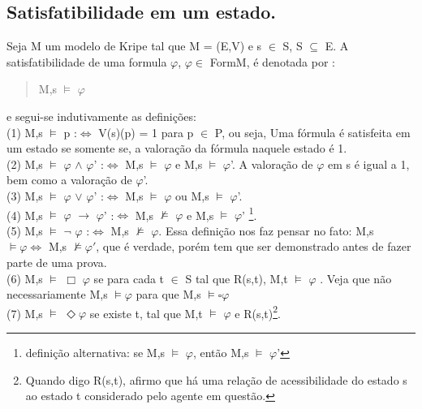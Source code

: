 \documentclass[12pt]{report}
\begin{document}
 \subsection{Satisfatibilidade em um estado.}%
 \hspace{0.5cm} Seja M um modelo de Kripe tal que M = (E,V) e s $\in$ S, S $\subseteq$ E. A satisfatibilidade de uma formula $\varphi$, $\varphi \in$ FormM, é denotada por :
 \begin{quote}
 \indent M,s $\vDash$ $\varphi$
 \end{quote}
 e segui-se indutivamente as definições:\\
\indent (1) M,s $\vDash$ p :$\Leftrightarrow$ V(s)(p) = 1 para p $\in$ P, ou seja, Uma fórmula é satisfeita em um estado se somente se, a valoração da fórmula naquele estado é 1.\\
\indent (2) M,s $\vDash$ $\varphi$ $\land$ $\varphi$' :$\Leftrightarrow$ M,s $\vDash$ $\varphi$ e M,s $\vDash$ $\varphi$'. A valoração de $\varphi$ em s é igual a 1, bem como a valoração de $\varphi$'.\\
\indent (3) M,s $\vDash$ $\varphi$ $\vee$ $\varphi$' :$\Leftrightarrow$ M,s $\vDash$ $\varphi$ ou M,s $\vDash$ $\varphi$'.\\
\indent (4) M,s $\vDash$ $\varphi$ $\rightarrow$ $\varphi$' :$\Leftrightarrow$ M,s $\nvDash$  $\varphi$ e M,s $\vDash$ $\varphi$' \footnote{definição alternativa: se M,s $\vDash$ $\varphi$, então M,s $\vDash$ $\varphi$'}. \\
\indent (5) M,s $\vDash$ $\neg$ $\varphi$ :$\Leftrightarrow$ M,s $\nvDash$ $\varphi$. Essa definição nos faz pensar no fato: M,s $\models \varphi \Leftrightarrow$  M,s $\nvDash \varphi'$, que é verdade, porém tem que ser demonstrado antes de fazer parte de uma prova.\\
\indent (6) M,s $\vDash$ $\Box$ $\varphi$ se para cada t $\in$ S tal que 
R(s,t), M,t $\vDash$ $\varphi$ . Veja que não necessariamente M,s $\models \varphi$ para que M,s $\models \square  \varphi$ \\
\indent (7) M,s $\vDash$ $\Diamond$$\varphi$ se existe t, tal que M,t $\vDash$ $\varphi$ e R(s,t)\footnote{Quando digo R(s,t), afirmo que há uma relação de acessibilidade do estado s ao estado t considerado pelo agente em questão.}.\\
\end{document}
